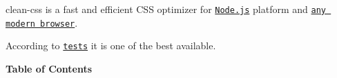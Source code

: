\section*{~\newline
  ~\newline
 ~\newline
 }

\href{https://www.npmjs.com/package/clean-css}{\tt } \href{https://travis-ci.org/jakubpawlowicz/clean-css}{\tt } \href{https://ci.appveyor.com/project/jakubpawlowicz/clean-css/branch/master}{\tt } \href{https://david-dm.org/jakubpawlowicz/clean-css}{\tt } \href{https://www.npmjs.com/package/clean-css}{\tt } \href{https://twitter.com/cleancss}{\tt }

clean-\/css is a fast and efficient C\+SS optimizer for \href{http://nodejs.org/}{\tt Node.\+js} platform and \href{https://jakubpawlowicz.github.io/clean-css}{\tt any modern browser}.

According to \href{http://goalsmashers.github.io/css-minification-benchmark/}{\tt tests} it is one of the best available.

{\bfseries Table of Contents}


